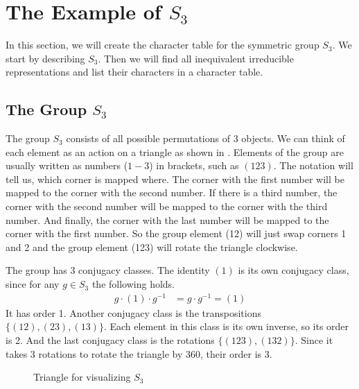 \section{The Example of $S_3$}

In this section, we will create the character table for the symmetric group $S_3$.
We start by describing $S_3$.
Then we will find all inequivalent irreducible representations and list their characters in a character table.

\subsection{The Group $S_3$}
\label{sec:ex.group}

The group $S_3$ consists of all possible permutations of $3$ objects.
We can think of each element as an action on a triangle as shown in .
Elements of the group are usually written as numbers ($1-3$) in brackets, such as $(123)$.
The notation will tell us, which corner is mapped where.
The corner with the first number will be mapped to the corner with the second number.
If there is a third number, the corner with the second number will be mapped to the corner with the third number.
And finally, the corner with the last number will be mapped to the corner with the first number.
So the group element (12) will just swap corners 1 and 2 and the group element (123) will rotate the triangle clockwise.

The group has 3 conjugacy classes.
The identity $(1)$ is its own conjugacy class, since for any $g \in S_3$ the following holds.
\begin{align}
    g \cdot (1) \cdot g^{-1} & = g \cdot g^{-1} = (1)
\end{align}
It has order 1.
Another conjugacy class is the transpositions $\{(12), (23), (13)\}$. 
Each element in this class is its own inverse, so its order is 2.
And the last conjugacy class is the rotations $\{(123), (132)\}$.
Since it takes 3 rotations to rotate the triangle by 360\textdegree, their order is 3.

\begin{figure}[!h]
    \centering
    

    \caption{Triangle for visualizing $S_3$}
    \label{fig:reprep.char.triangle}
\end{figure}

